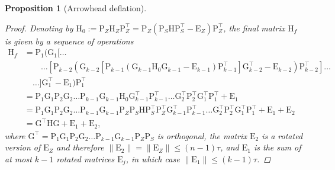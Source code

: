 \documentclass{article}
\newcommand{\lbrac}{\left[}
\newcommand{\rbrac}{\right]}
\newcommand{\lpar}{\left(}
\newcommand{\rpar}{\right)}
\newtheorem{proposition}{Proposition}[section]
\newcommand\matE{\boldsymbol{\mathrm{E}}}
\newcommand\matG{\boldsymbol{\mathrm{G}}}
\newcommand\matH{\boldsymbol{\mathrm{H}}}
\newcommand\matP{\boldsymbol{\mathrm{P}}}
\begin{document}
\begin{proposition}[Arrowhead deflation]
\begin{proof}
        Denoting by $\matH_0:=\matP_Z\matH_Z\matP_Z^\top
        =
        \matP_Z\lpar \matP_S\matH\matP_S^\top - \matE_Z\rpar \matP_Z^\top$,
        the final matrix $\matH_f$ is given by a sequence of operations
        \begin{align*}
        \matH_f
        &=
            \matP_1
            \bigg(
                \matG_1
                \bigg[
                    \ldots
                    \\
                    &\qquad\ldots
                    \lbrac
                        \matP_{k-2}
                        \lpar
                            \matG_{k-2}
                            \lbrac
                                \matP_{k-1}
                                \lpar \matG_{k-1}\matH_0\matG_{k-1} - \matE_{k-1} \rpar
                                \matP_{k-1}^\top
                            \rbrac
                            \matG_{k-2}^\top
                            -
                            \matE_{k-2}
                        \rpar
                        \matP_{k-2}^\top
                    \rbrac
                    \ldots
                    \\
                    &\quad\ldots
                \bigg]
                \matG_1^\top
                -
                \matE_1
            \bigg)
            \matP_1^\top
            \\
            &=
            \matP_1\matG_1\matP_2\matG_2\ldots\matP_{k-1}\matG_{k-1}
            \matH_0
            \matG_{k-1}^\top\matP_{k-1}^\top\ldots\matG_2^\top\matP_2^\top\matG_1^\top\matP_1^\top
            +
            \matE_1
            \\
            &=
            \matP_1\matG_1\matP_2\matG_2\ldots\matP_{k-1}\matG_{k-1}\matP_Z\matP_S\matH\matP_S^\top\matP_Z^\top
            \matG_{k-1}^\top\matP_{k-1}^\top\ldots\matG_2^\top\matP_2^\top\matG_1^\top\matP_1^\top
            +
            \matE_1
            +
            \matE_2
            \\
            &=
            \matG^\top \matH \matG
            +
            \matE_1
            +
            \matE_2,
        \end{align*}
        where $\matG^\top=\matP_1\matG_1\matP_2\matG_2\ldots\matP_{k-1}\matG_{k-1}\matP_Z\matP_S$ is orthogonal, the matrix $\matE_2$ is a rotated version of $\matE_Z$ and therefore $\|\matE_2\|=\|\matE_Z\|\leq (n-1)\tau$, and $\matE_1$ is the sum of at most $k-1$ rotated matrices $\matE_j$, in which case $\|\matE_1\|\leq (k-1)\tau$.


\end{proof}
\end{proposition}
\end{document}
